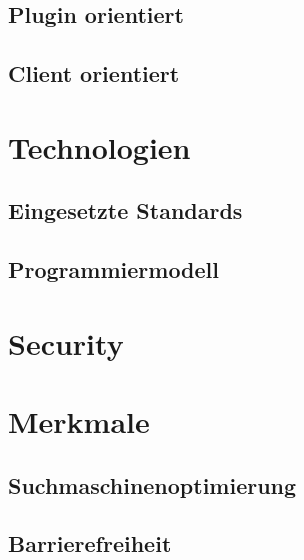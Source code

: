   \subsection{Plugin orientiert}

  \subsection{Client orientiert}
  
  \section{Technologien}
  
  \subsection{Eingesetzte Standards}
  
  \subsection{Programmiermodell}
  
  \section{Security}
  
  \section{Merkmale}
    
  \subsection{Suchmaschinenoptimierung}
  
  \subsection{Barrierefreiheit}
